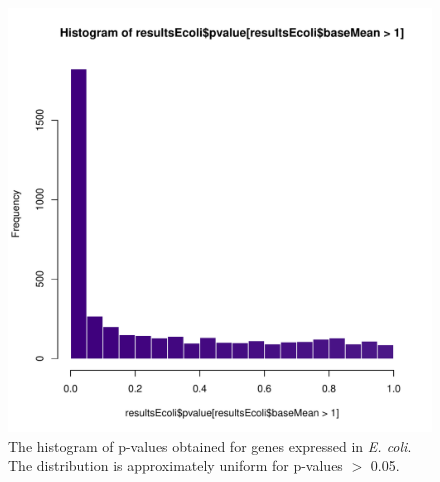 \begin{figure}[h!]
    \centering
    \includegraphics[scale=0.5]{Figures/Histogram_pvalues_E_coli.pdf}
    \caption{The histogram of p-values obtained for genes expressed in \textit{E. coli}. The distribution is approximately uniform for p-values $>$ 0.05. }
    \label{fig:E.coli_hist}
\end{figure}

